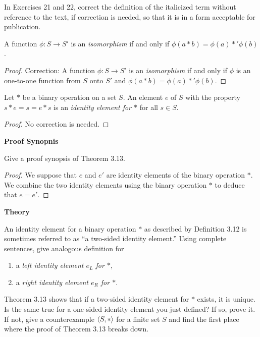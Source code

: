In Exercises 21 and 22, correct the definition of the italicized term without reference to the text, if correction is needed, so that it is in a form acceptable for publication.

\begin{exercise}
    A function $\phi: S\to S'$ is an \textit{isomorphism} if and only if $\phi(a * b) = \phi(a) *' \phi(b)$.
\end{exercise}

\begin{proof}
    Correction: A function $\phi: S\to S'$ is an \textit{isomorphism} if and only if $\phi$ is an one-to-one function from $S$ onto $S'$ and $\phi(a * b) = \phi(a) *' \phi(b)$.
\end{proof}

\begin{exercise}
    Let $*$ be a binary operation on a set $S$. An element $e$ of $S$ with the property $s * e = s = e * s$ is an \textit{identity element for $*$}  for all $s\in S$.
\end{exercise}

\begin{proof}
    No correction is needed.
\end{proof}

\textbf{Proof Synopnis}

\begin{exercise}
    Give a proof synopsis of Theorem 3.13.
\end{exercise}

\begin{proof}
    We suppose that $e$ and $e'$ are identity elements of the binary operation $*$. We combine the two identity elements using the binary operation $*$ to deduce that $e = e'$.
\end{proof}

\textbf{Theory}

\begin{exercise}
    An identity element for a binary operation $*$ as described by Definition 3.12 is sometimes referred to as ``a two-sided identity element.\@'' Using complete sentences, give analogous definition for
    \begin{enumerate}[label={\textbf{\alph*.}},itemsep=0pt]
        \item a \textit{left identity element $e_{L}$ for $*$},
        \item a \textit{right identity element $e_{R}$ for $*$}.
    \end{enumerate}

    Theorem 3.13 shows that if a two-sided identity element for $*$ exists, it is unique. Is the same true for a one-sided identity element you just defined? If so, prove it. If not, give a counterexample $\left\langle{S,*}\right\rangle$ for a finite set $S$ and find the first place where the proof of Theorem 3.13 breaks down.
\end{exercise}

